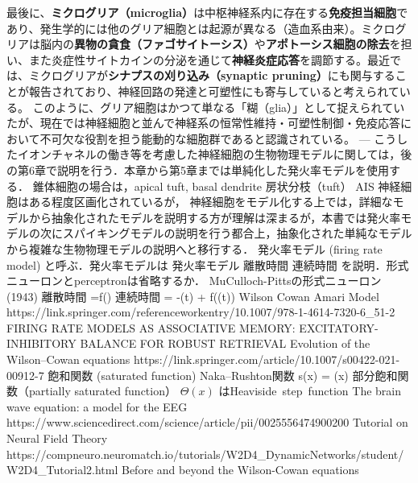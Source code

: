 最後に、\textbf{ミクログリア（microglia）}は中枢神経系内に存在する\textbf{免疫担当細胞}であり、発生学的には他のグリア細胞とは起源が異なる（造血系由来）。ミクログリアは脳内の\textbf{異物の貪食（ファゴサイトーシス）}や\textbf{アポトーシス細胞の除去}を担い、また炎症性サイトカインの分泌を通じて\textbf{神経炎症応答}を調節する。最近では、ミクログリアが\textbf{シナプスの刈り込み（synaptic pruning）}にも関与することが報告されており、神経回路の発達と可塑性にも寄与していると考えられている。
このように、グリア細胞はかつて単なる「糊（glia）」として捉えられていたが、現在では神経細胞と並んで神経系の恒常性維持・可塑性制御・免疫応答において不可欠な役割を担う能動的な細胞群であると認識されている。
---
こうしたイオンチャネルの働き等を考慮した神経細胞の生物物理モデルに関しては，後の第6章で説明を行う．本章から第5章までは単純化した発火率モデルを使用する．
錐体細胞の場合は，apical tuft, basal dendrite
房状分枝（tuft）
AIS
神経細胞はある程度区画化されているが，
神経細胞をモデル化する上では，詳細なモデルから抽象化されたモデルを説明する方が理解は深まるが，本書では発火率モデルの次にスパイキングモデルの説明を行う都合上，抽象化された単純なモデルから複雑な生物物理モデルの説明へと移行する．
発火率モデル (firing rate model) と呼ぶ．発火率モデルは
発火率モデル
離散時間
連続時間
を説明．形式ニューロンとperceptronは省略するか．
MuCulloch-Pittsの形式ニューロン (1943)
離散時間
=f()
連続時間
\tau{} = -(t) + f((t))
Wilson Cowan
Amari Model
https://link.springer.com/referenceworkentry/10.1007/978-1-4614-7320-6_51-2
FIRING RATE MODELS AS ASSOCIATIVE MEMORY: EXCITATORY-INHIBITORY BALANCE FOR ROBUST RETRIEVAL
Evolution of the Wilson–Cowan equations
https://link.springer.com/article/10.1007/s00422-021-00912-7
飽和関数 (saturated function) 
Naka–Rushton関数
s(x) = 
 \cdot \Theta (x)
部分飽和関数（partially saturated function）
$\Theta (x)$ はHeaviside step function
The brain wave equation: a model for the EEG
https://www.sciencedirect.com/science/article/pii/0025556474900200
Tutorial on Neural Field Theory
https://compneuro.neuromatch.io/tutorials/W2D4_DynamicNetworks/student/W2D4_Tutorial2.html
Before and beyond the Wilson-Cowan equations
